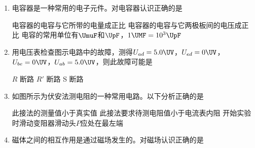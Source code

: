 \documentclass[\gkver]{gaokaozhenti}
\begin{document}
\begin{enumerate}

{若$Q$为正电荷，则$q$带正电，$F_{a}<F_{b}$}
{若$Q$为负电荷，则$q$带正电，$F_{a}>F_{b}$}
{若$Q$为负电荷，则$q$带正电，$F_{a}<F_{b}$}


\item
电容器是一种常用的电子元件。对电容器认识正确的是

{电容器的电容与它所带的电量成正比}
{电容器的电容与它两极板间的电压成正比}
{电容的常用单位有$\UmuF$和$\UpF$，$1\UMF=10^{3}\UpF$}


\item
用电压表检查图示电路中的故障，测得$U_{ad}=5.0\UV$，$U_{ed}=0\UV$，$U_{be}=0\UV$，$U_{ab}=5.0\UV$，则此故障可能是


{$R$ 断路}
{$R'$ 断路}
{S 断路}


\item
如图所示为伏安法测电阻的一种常用电路。以下分析正确的是


{此接法的测量值小于真实值}
{此接法要求待测电阻值小于电流表内阻}
{开始实验时滑动变阻器滑动头$P$应处在最左端}


\item
磁体之间的相互作用是通过磁场发生的。对磁场认识正确的是


\end{enumerate}
\end{document}
